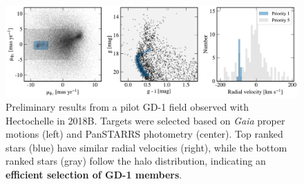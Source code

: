 \documentclass[12pt]{article}
\begin{document}
\begin{figure}\vskip-0.3in
\begin{center}
\includegraphics[width=1\textwidth]{../plots/prop_fig3.pdf}
\caption{\small Preliminary results from a pilot GD-1 field observed with Hectochelle in 2018B.
Targets were selected based on \emph{Gaia} proper motions (left) and PanSTARRS photometry (center).
Top ranked stars (blue) have similar radial velocities (right), while the bottom ranked stars (gray) follow the halo distribution, indicating an {\bf efficient selection of GD-1 members}.
}
\label{fig:targets}
\end{center}
\end{figure}

%
%
%
%

%
\end{document}

